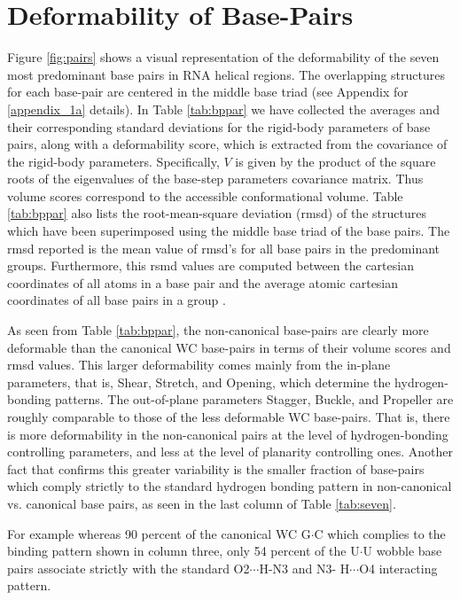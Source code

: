 \section{Deformability of Base-Pairs}
Figure   \ref{fig:pairs}  shows   a  visual   representation   of  the
deformability of the seven most  predominant base pairs in RNA helical
regions. The overlapping structures for each base-pair are centered in
the middle  base triad  (see Appendix for  \ref{appendix_1a} details).
In  Table \ref{tab:bppar}  we have  collected the  averages  and their
corresponding  standard deviations  for the  rigid-body  parameters of
base pairs, along with a  deformability score, which is extracted from
the  covariance  of   the  rigid-body  parameters.  Specifically,  $V$
\cite{olson1998} is  given by the product  of the square  roots of the
eigenvalues  of  the  base-step  parameters covariance  matrix.   Thus
volume   scores   correspond    to   the   accessible   conformational
volume.   Table  \ref{tab:bppar}   also  lists   the  root-mean-square
deviation (rmsd) of the  structures which have been superimposed using
the middle base triad of the base pairs. The rmsd reported is the mean
value  of  rmsd's  for  all  base pairs  in  the  predominant  groups.
Furthermore,  this  rsmd values  are  computed  between the  cartesian
coordinates  of  all atoms  in  a base  pair  and  the average  atomic
cartesian coordinates of all base pairs in a group \cite{eargle2006}.

As seen  from Table \ref{tab:bppar}, the  non-canonical base-pairs are
clearly more deformable  than the canonical WC base-pairs  in terms of
their volume  scores and rmsd values. This  larger deformability comes
mainly  from the  in-plane parameters,  that is,  Shear,  Stretch, and
Opening,   which  determine   the   hydrogen-bonding  patterns.    The
out-of-plane  parameters Stagger,  Buckle, and  Propeller  are roughly
comparable to  those of  the less deformable  WC base-pairs.  That is,
there is more deformability in the non-canonical pairs at the level of
hydrogen-bonding  controlling parameters,  and  less at  the level  of
planarity controlling  ones. Another  fact that confirms  this greater
variability  is  the  smaller  fraction  of  base-pairs  which  comply
strictly to the standard hydrogen bonding pattern in non-canonical vs.
canonical  base   pairs,  as  seen   in  the  last  column   of  Table
\ref{tab:seven}.

For example  whereas 90  percent of the  canonical WC  G$\cdot$C which
complies to the binding pattern shown in column three, only 54 percent
of  the  U$\cdot$U  wobble  base  pairs associate  strictly  with  the
standard O2$\cdots$H-N3 and N3- H$\cdots$O4 interacting pattern.

